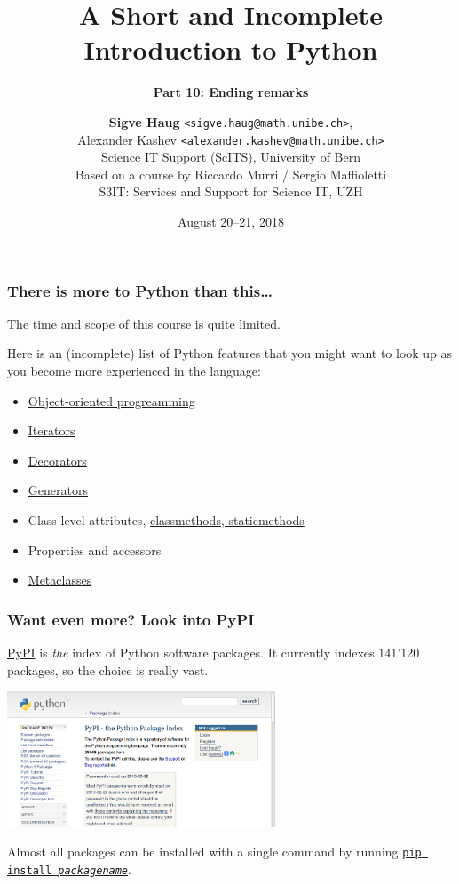 \documentclass[english,serif,mathserif,xcolor=pdftex,dvipsnames,table]{beamer}
\title[Introduction to Python]{%
  A Short and Incomplete Introduction to Python
}
\subtitle{\bfseries Part 10: Ending remarks}
\author[S.~Haug]{%
  \textbf{Sigve Haug} \texttt{<sigve.haug@math.unibe.ch>}, \\
  Alexander Kashev \texttt{<alexander.kashev@math.unibe.ch>} \\
  Science IT Support (ScITS), University of Bern \\
  \medskip
  Based on a course by Riccardo Murri / Sergio Maffioletti
  \\
  S3IT: Services and Support for Science IT, UZH
}
\date{August 20--21, 2018}
\begin{document}
\maketitle



\begin{frame}
  \frametitle{There is more to Python than this\ldots}

  The time and scope of this course is quite limited.

  \+
  Here is an (incomplete) list of Python features that you might
  want to look up as you become more experienced in the language:
  \begin{itemize}
  \item \href{https://github.com/gc3-uzh-ch/python-course}{Object-oriented progreamming}
  \item
    \href{http://docs.python.org/2/tutorial/classes.html\#iterators}{Iterators}
  \item
    \href{http://www.artima.com/weblogs/viewpost.jsp?thread=240808}{Decorators}
  \item \href{http://docs.python.org/2/tutorial/classes.html\#generators}{Generators}
  \item Class-level attributes, \href{http://stackoverflow.com/a/12179752/1808780}{classmethods, staticmethods}
  \item Properties and accessors
  \item \href{http://stackoverflow.com/a/6581949/459543}{Metaclasses}
  \end{itemize}
\end{frame}


\begin{frame}
  \frametitle{Want even more? Look into PyPI}
  \small

  \href{http://pypi.python.org}{PyPI} is \emph{the} index of Python software packages.
  It currently indexes 141'120 packages, so the choice is really vast.

  \begin{center}
    \includegraphics[width=0.60\textwidth]{fig/pypi_screenshot.png}
  \end{center}

  Almost all packages can be installed with a single command by
  running \href{https://pypi.python.org/pypi/pip}{\texttt{pip install
    \emph{packagename}}}.

\end{frame}
\end{document}
